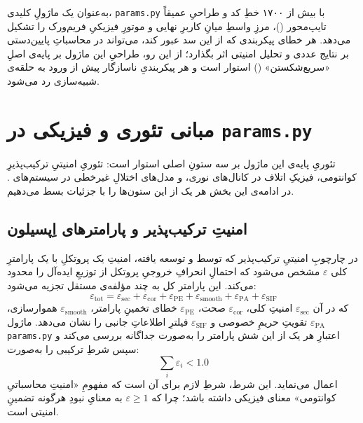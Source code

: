 به‌عنوان یک ماژولِ کلیدی، \texttt{params.py} با بیش از ۱۷۰۰ خطِ کد و طراحیِ عمیقاً تایپ‌محور ()، مرزِ واسطِ میانِ کاربرِ نهایی و موتورِ فیزیکیِ فریم‌ورک را تشکیل می‌دهد. هر خطای پیکربندی که از این سد عبور کند، می‌تواند در محاسباتِ پایین‌دستی بر نتایج عددی و تحلیل امنیتی اثر بگذارد؛ از این رو، طراحیِ این ماژول بر پایه‌ی اصلِ «سریع‌شکستن» () استوار است و هر پیکربندیِ ناسازگار پیش از ورود به حلقه‌ی شبیه‌سازی رد می‌شود.

\section{مبانی تئوری و فیزیکی در \texttt{params.py}}

تئوریِ پایه‌ی این ماژول بر سه ستونِ اصلی استوار است: تئوریِ امنیتیِ ترکیب‌پذیرِ کوانتومی، فیزیکِ اتلاف در کانال‌های نوری، و مدل‌های اختلالِ غیرخطی در سیستم‌های . در ادامه‌ی این بخش هر یک از این ستون‌ها را با جزئیات بسط می‌دهیم.

\subsection{امنیتِ ترکیب‌پذیر و پارامترهای اِپسیلون}

در چارچوبِ امنیتیِ ترکیب‌پذیر که توسط  و  توسعه یافته، امنیتِ یک پروتکلِ  با یک پارامترِ کلی $\varepsilon$ مشخص می‌شود که احتمالِ انحرافِ خروجیِ پروتکل از توزیعِ ایده‌آل را محدود می‌کند. این پارامتر کل به چند مؤلفه‌ی مستقل تجزیه می‌شود:
\begin{equation}
	\varepsilon_{\text{tot}} = \varepsilon_{\text{sec}} + \varepsilon_{\text{cor}} + \varepsilon_{\text{PE}} + \varepsilon_{\text{smooth}} + \varepsilon_{\text{PA}} + \varepsilon_{\text{SIF}}
\end{equation}
که در آن $\varepsilon_{\text{sec}}$ امنیتِ کلی، $\varepsilon_{\text{cor}}$ صحت، $\varepsilon_{\text{PE}}$ خطای تخمینِ پارامتر، $\varepsilon_{\text{smooth}}$ هموارسازی، $\varepsilon_{\text{PA}}$ تقویتِ حریمِ خصوصی و $\varepsilon_{\text{SIF}}$ فیلترِ اطلاعاتِ جانبی را نشان می‌دهد. ماژول \texttt{params.py} اعتبارِ هر یک از این شش پارامتر را به‌صورت جداگانه بررسی می‌کند و سپس شرطِ ترکیبی را به‌صورت:
\begin{equation}
	\sum_i \varepsilon_i < 1.0
\end{equation}
اعمال می‌نماید. این شرط، شرطِ لازم برای آن است که مفهومِ «امنیتِ محاسباتیِ کوانتومی» معنای فیزیکی داشته باشد؛ چرا که $\varepsilon \geq 1$ به معنایِ نبودِ هرگونه تضمینِ امنیتی است.

